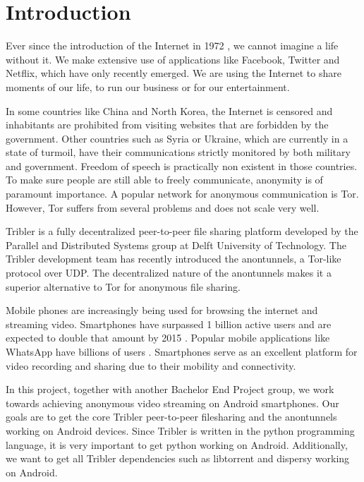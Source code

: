\chapter{Introduction}

Ever since the introduction of the Internet in 1972 \cite{leiner1997past}, we cannot imagine a life without it. We make extensive use of applications like Facebook, Twitter and Netflix, which have only recently emerged. We are using the Internet to share moments of our life, to run our business or for our entertainment.

In some countries like China and North Korea, the Internet is censored and inhabitants are prohibited from visiting websites that are forbidden by the government. Other countries such as Syria or Ukraine, which are currently in a state of turmoil, have their communications strictly monitored by both military and government. Freedom of speech is practically non existent in those countries. To make sure people are still able to freely communicate, anonymity is of paramount importance. A popular network for anonymous communication is Tor. However, Tor suffers from several problems and does not scale very well.

Tribler is a fully decentralized peer-to-peer file sharing platform developed by the Parallel and Distributed Systems group at Delft University of Technology. The Tribler development team has recently introduced the anontunnels, a Tor-like protocol over UDP. The decentralized nature of the anontunnels makes it a superior alternative to Tor for anonymous file sharing.

Mobile phones are increasingly being used for browsing the internet and streaming video. Smartphones have surpassed 1 billion active users and are expected to double that amount by 2015 \cite{yang2015smartphones}. Popular mobile applications like WhatsApp have billions of users \cite{googleplayinstagram, googleplaywhatsapp}. Smartphones serve as an excellent platform for video recording and sharing due to their mobility and connectivity.

In this project, together with another Bachelor End Project group, we work towards achieving anonymous video streaming on Android smartphones. Our goals are to get the core Tribler peer-to-peer filesharing and the anontunnels working on Android devices. Since Tribler is written in the python programming language, it is very important to get python working on Android. Additionally, we want to get all Tribler dependencies such as libtorrent and dispersy working on Android.